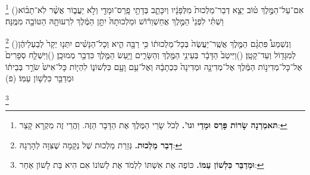 \documentclass[12pt, openany]{book}
\newcommand{\footnotecomment}[1]{
	\renewcommand\thefootnote{}
	\footnote{\textsf{#1}}}
\newcommand{\commenta}[1]{\footnotecomment{#1}\hspace{0em}}
\newcommand{\vsnum}[1]{(\hebrewnumeral{#1})\space}
\begin{document}
\begin{multicols}{2}
\commenta{\textrm{\textbf{תּאמַרְנָה שָׂרוֹת פָּרַס וּמָדַי וגו'.}} לְכֹל שָׂרֵי הַמֶּלֶךְ אֶת הַדָּבָר הַזֶּה. וַהֲרֵי זֶה מִקְרָא קָצֵר:}%
\vsnum{19}אִם־עַל־הַמֶּ֣לֶךְ ט֗וֹב יֵצֵ֤א דְבַר־מַלְכוּת֙ מִלְּפָנָ֔יו וְיִכָּתֵ֛ב בְּדָתֵ֥י פָֽרַס־וּמָדַ֖י וְלֹ֣א יַעֲב֑וֹר אֲשֶׁ֨ר לֹֽא־תָב֜וֹא וַשְׁתִּ֗י לִפְנֵי֙ הַמֶּ֣לֶךְ אֲחַשְׁוֵר֔וֹשׁ וּמַלְכוּתָהּ֙ יִתֵּ֣ן הַמֶּ֔לֶךְ לִרְעוּתָ֖הּ הַטּוֹבָ֥ה מִמֶּֽנָּה׃%
\commenta{\textrm{\textbf{דְבַר מַלְכוּת.}} גְּזֵרַת מַלְכוּת שֶׁל נְקָמָה שֶׁצִּוָּה לְהָרְגָהּ:}%
\vsnum{20}וְנִשְׁמַע֩ פִּתְגָ֨ם הַמֶּ֤לֶךְ אֲשֶֽׁר־יַעֲשֶׂה֙ בְּכָל־מַלְכוּת֔וֹ כִּ֥י רַבָּ֖ה הִ֑יא וְכָל־הַנָּשִׁ֗ים יִתְּנ֤וּ יְקָר֙ לְבַעְלֵיהֶ֔ן לְמִגָּד֖וֹל וְעַד־קָטָֽן׃
\vsnum{21}וַיִּיטַב֙ הַדָּבָ֔ר בְּעֵינֵ֥י הַמֶּ֖לֶךְ וְהַשָּׂרִ֑ים וַיַּ֥עַשׂ הַמֶּ֖לֶךְ כִּדְבַ֥ר מְמוּכָֽן׃
\vsnum{22}וַיִּשְׁלַ֤ח סְפָרִים֙ אֶל־כָּל־מְדִינ֣וֹת הַמֶּ֔לֶךְ אֶל־מְדִינָ֤ה וּמְדִינָה֙ כִּכְתָבָ֔הּ וְאֶל־עַ֥ם וָעָ֖ם כִּלְשׁוֹנ֑וֹ לִהְי֤וֹת כָּל־אִישׁ֙ שֹׂרֵ֣ר בְּבֵית֔וֹ וּמְדַבֵּ֖ר כִּלְשׁ֥וֹן עַמּֽוֹ׃ (פ)%
\commenta{\textrm{\textbf{וּמְדַבֵּר כִּלְשׁוֹן עַמּוֹ.}} כּוֹפֶה אֶת אִשְׁתּוֹ לִלְמֹד אֶת לְשׁוֹנוֹ אִם הִיא בַּת לָשׁוֹן אַחֵר:}%
\end{multicols}\newpage
\end{document}
